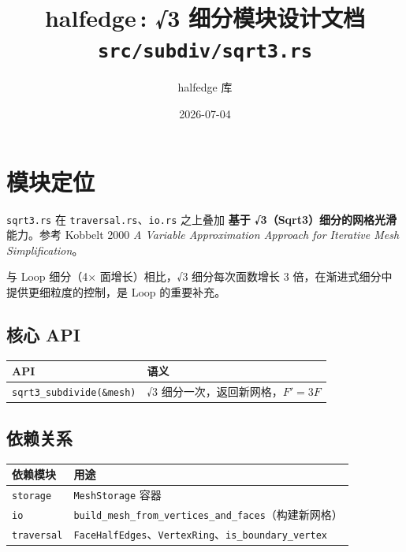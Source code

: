 \documentclass[11pt,a4paper]{article}
\title{\textbf{halfedge\,: √3 细分模块设计文档} \\ \large \texttt{src/subdiv/sqrt3.rs}}
\author{halfedge 库}
\date{2026-07-04}
\begin{document}
\maketitle
\tableofcontents

\section{模块定位}

\texttt{sqrt3.rs} 在 \texttt{traversal.rs}、\texttt{io.rs} 之上叠加
\textbf{基于 √3（Sqrt3）细分的网格光滑}能力。参考 Kobbelt 2000
\textit{A Variable Approximation Approach for Iterative Mesh Simplification}。

与 Loop 细分（4× 面增长）相比，√3 细分每次面数增长 3 倍，在渐进式细分中
提供更细粒度的控制，是 Loop 的重要补充。

\subsection{核心 API}

\begin{center}
\renewcommand{\arraystretch}{1.18}
\begin{tabular}{@{}lp{8.5cm}@{}}
  \toprule
  \textbf{API} & \textbf{语义} \\
  \midrule
  \texttt{sqrt3\_subdivide(\&mesh)} & √3 细分一次，返回新网格，$F'=3F$ \\
  \bottomrule
\end{tabular}
\end{center}

\subsection{依赖关系}

\begin{center}
\renewcommand{\arraystretch}{1.18}
\begin{tabular}{@{}ll@{}}
  \toprule
  \textbf{依赖模块} & \textbf{用途} \\
  \midrule
  \texttt{storage} & \texttt{MeshStorage} 容器 \\
  \texttt{io} & \texttt{build\_mesh\_from\_vertices\_and\_faces}（构建新网格） \\
  \texttt{traversal} & \texttt{FaceHalfEdges}、\texttt{VertexRing}、\texttt{is\_boundary\_vertex} \\
  \bottomrule
\end{tabular}
\end{center}
\end{document}
